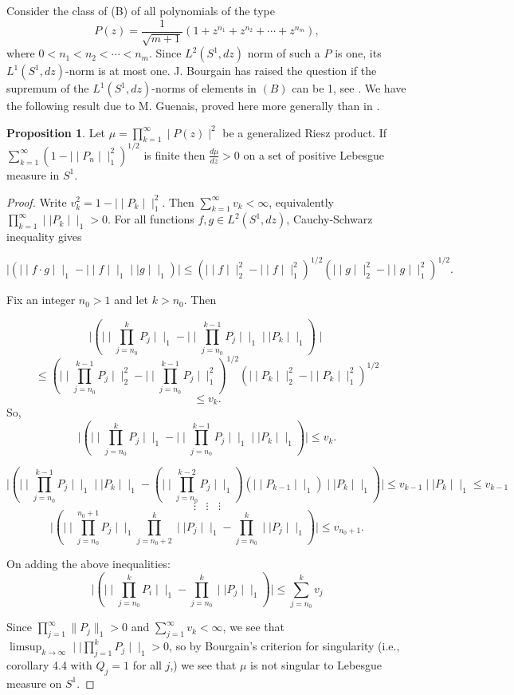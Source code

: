 \documentclass{amsart}
\theoremstyle{definition}
\newtheorem{Prop}[Th]{Proposition}
\theoremstyle{remark}
\numberwithin{equation}{section}
\newcommand{\1}{\mathbb{1}}
\begin{document}
Consider the class of (B) of all polynomials of the type
 $$P(z) = \frac{1}{\sqrt{m+1}}(1 + z^{n_1} + z^{n_2} + \cdots +z^{n_m}),$$ where $0 <n_1 < n_2 < \cdots < n_m$.
 Since $L^2(S^1,dz)$ norm of such a $P $  is one, its $L^1(S^1,dz)$-norm is at most one. J. Bourgain\cite{bourgain} has raised the question if the supremum of the $L^1(S^1,dz)$-norms of elements in  $(B)$ can be 1, see \cite{bourgain}. We have the following result due to M. Guenais, proved here more generally than in \cite{Guenais}.

\begin{Prop}\label{prop1}
 Let $\mu = \prod_{k=1}^\infty \mid P(z)\mid^2$ be a generalized
Riesz product. If  $\sum_{k=1}^\infty ( 1 - \mid\mid P_n\mid\mid_1^2)^{1/2}$ is finite then $\frac{d\mu}{dz} > 0$ on a set of positive Lebesgue measure in $S^1$.
\end{Prop}
\begin{proof}
Write $v_k^2 =  1 - \mid\mid P_k\mid\mid_1^2$. Then
$\sum_{k=1}^\infty v_k < \infty$, equivalently\linebreak $\prod_{k=1}^\infty\mid\mid P_k\mid\mid_1 >0$. For all functions $f,g \in L^2(S^1, dz)$, Cauchy-Schwarz inequality gives

$$\mid(\mid\mid f\cdot g\mid\mid_1   - \mid\mid f\mid\mid_1 \mid\mid g\mid\mid_1)\mid \leq (\mid\mid f\mid\mid_2^2 -\mid\mid f\mid\mid_1^2)^{1/2} (\mid\mid g\mid\mid_2^2 -\mid\mid g\mid\mid_1^2)^{1/2}.$$

Fix an integer $n_0 > 1$ and let $k > n_0$. Then

$$\mid( \mid \mid\prod_{j=n_0}^k P_j\mid\mid_1 - \mid\mid\prod_{j=n_0}^{k-1}P_j\mid\mid_1\mid\mid P_k\mid\mid_1)\mid$$
$$\leq (\mid\mid \prod_{j=n_0}^{k-1}P_j\mid\mid_2^2 - \mid\mid \prod_{j=n_0}^{k-1} P_j\mid\mid_1^2)^{1/2} ( \mid\mid P_k\mid\mid_2^2 - \mid\mid P_k\mid\mid_1^2)^{1/2}$$
$$\leq v_k.$$
 So,
 $$ \mid(\mid \mid\prod_{j=n_0}^k P_j\mid\mid_1 - \mid\mid\prod_{j=n_0}^{k-1}P_j\mid\mid_1\mid\mid P_k\mid\mid_1)\mid \leq v_k.$$


$$\mid(\mid\mid \prod_{j=n_0}^{k-1} P_j\mid\mid_1\mid\mid P_k\mid\mid_1 - (\mid\mid\prod_{j=n_0}^{k-2}P_j\mid\mid_1)(\mid\mid P_{k-1}\mid\mid_1)\mid\mid P_k\mid\mid_1)\mid \leq v_{k-1}\mid\mid P_k\mid\mid_1 \leq v_{k-1}$$
                       $${  \vdots   ~~~~ \vdots    ~~~~  \vdots}$$
$$\mid(\mid\mid \prod_{j=n_0}^{n_0 +1}P_j\mid\mid_1\prod_{j=n_0+2}^k\mid\mid P_j\mid\mid_1- \prod_{j=n_0}^k\mid\mid P_j\mid\mid_1)\mid \leq v_{n_0+1}.$$

On adding the above inequalities:
$$\mid( \mid\mid\prod_{j=n_0}^kP_i\mid\mid_1 - \prod_{j=n_0}^k\mid\mid P_j\mid\mid_1)\mid \leq \sum_{j=n_0}^kv_j$$

Since $\prod_{j=1}^\infty \|P_j\|
_1 > 0$ and $\sum_{j=1}^\infty v_k < \infty$,
we see that\linebreak $\displaystyle \limsup_{k\rightarrow \infty}\mid\mid \prod_{j=1}^k P_j\mid\mid_1  > 0$,
so by Bourgain's criterion for singularity (i.e., corollary 4.4 with $Q_j =1$ for all $j$,)  we see that $\mu$ is not singular to Lebesgue measure
on $S^1$.
\end{proof}
\end{document}

